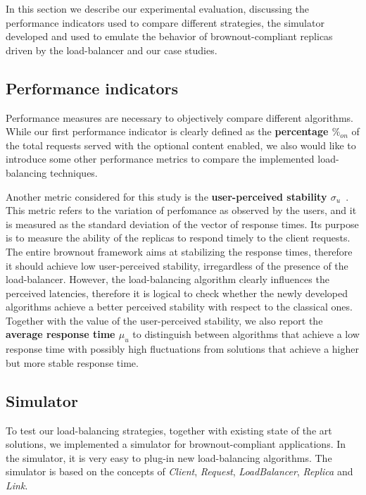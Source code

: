 In this section we describe our experimental evaluation, discussing
the performance indicators used to compare different strategies, the
simulator developed and used to emulate the behavior of
brownout-compliant replicas driven by the load-balancer and our case
studies.

\subsection{Performance indicators}

Performance measures are necessary to objectively compare different
algorithms. While our first performance indicator is clearly defined
as the \textbf{percentage $\%_{on}$} of the total requests served with
the optional content enabled, we also would like to introduce some
other performance metrics to compare the implemented load-balancing
techniques.

Another metric considered for this study is the \textbf{user-perceived
  stability $\sigma_u$}~\cite{GeograficalSASO}. This metric refers to
the variation of perfomance as observed by the users, and it is
measured as the standard deviation of the vector of response
times. Its purpose is to measure the ability of the replicas to
respond timely to the client requests. The entire brownout framework
aims at stabilizing the response times, therefore it should achieve
low user-perceived stability, irregardless of the presence of the
load-balancer. However, the load-balancing algorithm clearly
influences the perceived latencies, therefore it is logical to check
whether the newly developed algorithms achieve a better perceived
stability with respect to the classical ones. Together with the value
of the user-perceived stability, we also report the \textbf{average
  response time $\mu_u$} to distinguish between algorithms that
achieve a low response time with possibly high fluctuations from
solutions that achieve a higher but more stable response time.

\subsection{Simulator}

To test our load-balancing strategies, together with existing state of
the art solutions, we implemented a simulator for brownout-compliant
applications. In the simulator, it is very easy to plug-in new
load-balancing algorithms. The simulator is based on the concepts of
\emph{Client}, \emph{Request}, \emph{LoadBalancer}, \emph{Replica} and
\emph{Link}.

